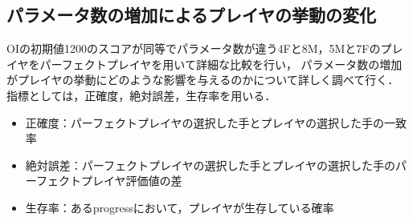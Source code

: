 \subsection{パラメータ数の増加によるプレイヤの挙動の変化}
OIの初期値1200のスコアが同等でパラメータ数が違う4Fと8M，5Mと7Fのプレイヤをパーフェクトプレイヤを用いて詳細な比較を行い，
パラメータ数の増加がプレイヤの挙動にどのような影響を与えるのかについて詳しく調べて行く．
指標としては，正確度，絶対誤差，生存率を用いる．
\begin{itemize}
    \item 正確度：パーフェクトプレイヤの選択した手とプレイヤの選択した手の一致率
    \item 絶対誤差：パーフェクトプレイヤの選択した手とプレイヤの選択した手のパーフェクトプレイヤ評価値の差
    \item 生存率：あるprogressにおいて，プレイヤが生存している確率
\end{itemize}

